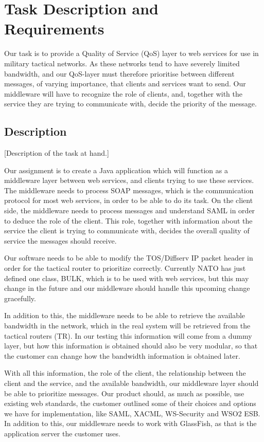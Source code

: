 \section{Task Description and Requirements}\label{Task Description and Requirements} 

    Our task is to provide a Quality of Service (QoS) layer to web services for use in military tactical networks. As these networks tend to have severely limited bandwidth, and our QoS-layer must therefore prioritise between different messages, of varying importance, that clients and services want to send. Our middleware will have to recognize the role of clients, and, together with the service they are trying to communicate with, decide the priority of the message.
    
    
    \subsection{Description}\label{Description} 
    [Description of the task at hand.]
        
    Our assignment is to create a Java application which will function as a middleware layer between web services, and clients trying to use these services. The middleware needs to process SOAP messages, which is the communication protocol for most web services, in order to be able to do its task. On the client side, the middleware needs to process messages and understand SAML in order to deduce the role of the client. This role, together with information about the service the client is trying to communicate with, decides the overall quality of service the messages should receive. 

    Our software needs to be able to modify the TOS/Diffserv IP packet header in order for the tactical router to prioritize correctly. Currently NATO has just defined one class, BULK, which is to be used with web services, but this may change in the future and our middleware should handle this upcoming change gracefully.

    In addition to this, the middleware needs to be able to retrieve the available bandwidth in the network, which in the real system will be retrieved from the tactical routers (TR). In our testing this information will come from a dummy layer, but how this information is obtained should also be very modular, so that the customer can change how the bandwidth information is obtained later.

    With all this information, the role of the client, the relationship between the client and the service, and the available bandwidth, our middleware layer should be able to prioritize messages. Our product should, as much as possible, use existing web standards, the customer outlined some of their choices and options we have for implementation, like SAML, XACML, WS-Security and WSO2 ESB. In addition to this, our middleware needs to work with GlassFish, as that is the application server the customer uses.
   
